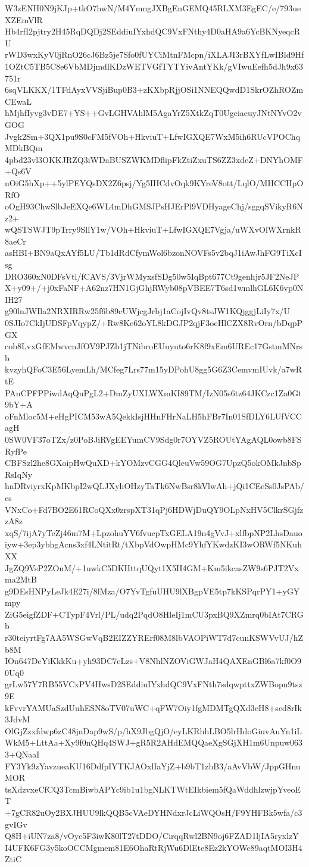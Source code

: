 W3zENH0N9jKJp+tkO7hwN/M4YmngJXBgEnGEMQ45RLXM3EgEC/e/793ueXZEmVlR
Hb4rfI2pjtry2H45RqDQDj2SEddiuIYxhdQC9VxFNthy4D0aHA9a6YcBKNyeqcRU
rWD3wxKyV0jRnO26cJ6Bz5je7Sfo0fUYCiMtnFMcpn/iXLAJI3rBXYfLwIBld9Hf
1OZtC5TB5C8e6VbMDjmdlKDzWETVGfTYTYivAntYKk/gVIwuEefh5dJh9x63751r
6sqVLKKX/1TFdAyxVVSjiBup0B3+zKXbpRjjOSi1NNEQQwdD1SkrOZhROZmCEwaL
hMjhfIyvg3vDE7+YS++GvLGHVAhlM5AgaYrZ5XtkZqT0UgeiaeuyJNtNYvO2vGOG
Jvgk2Sm+3QX1pu9S0cFM5fVOh+HkviuT+LfwIGXQE7WxM5ih6RUcVPOChqMDkBQm
4pbd23vl3OKKJRZQ3iWDaBUSZWKMDflipFkZtiZxuTS6ZZ3xdeZ+DNYhOMF+Qs6V
nOiG5hXp++5ylPEYQsDX2Z6psj/Yg5IHCdvOqk9KYreV8ott/LqlO/MHCCHpORfO
oOgH93ChwSlbJeEXQe6WL4mDhGMSJPsHJErPl9VDHyageChj/sggqSVikyR6Nz2+
wQSTSWJT9pTrry9SllY1w/VOh+HkviuT+LfwIGXQE7Vgja/uWXvOlWXrnkR8aeCr
asHBI+BN9aQxAYf5LU/Tb1dRdCfymWol6bzonNOVFs5v2bqJ1iAwJhFG9TiXcIsg
DRO360xN0DFsVtl/fCAVS/3VjrWMyxsfSDg50w5IqBpt677Ct9genhjr5JF2NeJP
X+y09+/+j0xFaNF+A62nz7HN1GjGhjRWyb08pVBEE7T6sd1wmlhGL6K6vp0NIH27
g90lnJWIla2NRXIRRw25f6b89cUWjcgJrbj1aCojIvQv8tsJW1KQjggjLiIy7x/U
0SJIo7CkIjUDSFpVqypZ/+Rw8Ke62oYL8kDGJP2qjF3oeHlCZX8RvOrn/bDqpPGX
cob8LvxGfEMwvcnJfOV9PJZb1jTNibroEUuyuto6rK8f9xEm6UREc17GstmMNrsb
kvzyhQFoC3E56LyemLh/MCfeg7Lrs77m15yDPohU8gg5G6Z3CemvmIUvk/a7wRtE
PAnCPFPPiwdAqQuPgL2+DmZyUXLWXmKI89TM/IzN05s6tz64JKCzc1Za0Gt9bY+A
oFnMloc5M+eHgPICM53wA5QekkIsjHHnFHrNaLH5hFBr7In01SfDLY6LUfVCCagH
0SW0VF37oTZx/z0PoBJiRVgEEYumCV9Sdg0r7OYVZ5ROUtYAgAQL0owb8FSRyfPe
CBFSzl2he8GXoipHwQuXD+kYOMzvCGG4QleuVw59OG7UpzQ5okOMkJnbSpRsIqNy
hnDRviyrxKpMKbpI2wQLJXyhOHzyTaTk6NwBsr8kVlwAh+jQi1CEeSs0JsPAb/cs
VNxCo+Fd7BO2E61RCoQXx0zrspXT31qPj6HDWjDuQY9OLpNxHV5ClkrSGjfzzA8z
xqS/7ijA7yTeZj46m7M+LpzohuYV6fvucpTxGELA19n4gVvJ+xlfbpNP2LhsDauo
iyw+3ep3ybhgAcns3xf4LNtitRt/tXbpVdOwpHMc9YhfYKwdzKI3wORWf5NKuhXX
JgZQ9VsP2ZOuM/+1uwkC5DKHttqUQyt1X5H4GM+Km5ikcasZW9s6PJT2Vxma2MtB
g9DEsHNPyLeJk4E27i/8lMza/O7YvTgfuUHU9lXBgpVE5tp7kKSPqrPY1+yGYmpy
ZiG5eigfZDF+CTypF4Vrl/PL/udq2PqdO8HleIj1mCU3pxBQ9XZmrq0bIAt7CRGb
r30teiyrtFg7AA5WSGwVqB2EIZZYRErf08M8lbVAOPiWT7d7cunKSWVvUJ/hZb8M
IOn647DeYiKkkKu+yh93DC7eLzs+V8NhlNZOViGWJaH4QAXEnGBl6a7kf0O90Uq0
grLw57Y7RB55VCxPV4HwsD2SEddiuIYxhdQC9VxFNth7sdqwpttxZWBopn9tsz9E
kFvvrYAMUaSzdUuhESN8oTV07uWC+qFW7Oiy1fgMDMTgQXd3eH8+sed8rIk3JdvM
OlGjZzxfdwp6zC48jnDap9wS/p/hX9JbgQjO/eyLKRhhLBO5lrHdoGiuvAuYn1iL
WkM5+LttAa+Xy9f0nQHq4SWJ+gR5R2AHdEMQQaeXgSGjXH1m6Unpuw0633+QNaaI
FY3Yk9zYavzueaKU16DdfpIYTKJAOxlIaYjZ+b9bT1zbB3/aAvVbW/JppGHnuMOR
tsXdzvxeCfCQ3TcmBiwbAPYc9ib1u1bgNLKTWtEIkbiem5fQaWddhlzwjpYveoET
+7gCR82uOy2BXJHUU9lkQQB5cVAeDYHNdxrJcLiWQOsH/F9YHFBk5wfa/c3gvIGv
Q8H+iUN7za8/vOyc5F3iwK80lT27tDDO/CirqqRwl2BN9oj6FZAD1ljIA5ryxlzY
I4UFK6FG3y5koOCCMgmem81E6OhaRtRjWu6DlEte8Ez2kYOWc89aqtMOI3H4ZtiC

